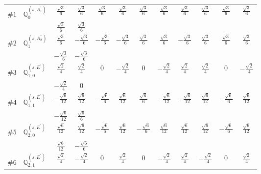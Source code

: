 \documentclass[fleqn,9pt,landscape]{jsarticle}
\begin{document}
\begin{center}
\begin{longtable}{lcccccccccc}
$ \#1\quad \mathbb{Q}_{0}^{(s,A_{1}^{\prime})} $ & $ \frac{\sqrt{3}}{6} $ & $ \frac{\sqrt{3}}{6} $ & $ \frac{\sqrt{3}}{6} $ & $ \frac{\sqrt{3}}{6} $ & $ \frac{\sqrt{3}}{6} $ & $ \frac{\sqrt{3}}{6} $ & $ \frac{\sqrt{3}}{6} $ & $ \frac{\sqrt{3}}{6} $ & $ \frac{\sqrt{3}}{6} $ & $ \frac{\sqrt{3}}{6} $ \\
& $ \frac{\sqrt{3}}{6} $ & $ \frac{\sqrt{3}}{6} $ & $  $ & $  $ & $  $ & $  $ & $  $ & $  $ & $  $ & $  $ \\ \hline
$ \#2\quad \mathbb{Q}_{1}^{(s,A_{2}^{\prime\prime})} $ & $ \frac{\sqrt{3}}{6} $ & $ - \frac{\sqrt{3}}{6} $ & $ - \frac{\sqrt{3}}{6} $ & $ - \frac{\sqrt{3}}{6} $ & $ \frac{\sqrt{3}}{6} $ & $ \frac{\sqrt{3}}{6} $ & $ - \frac{\sqrt{3}}{6} $ & $ \frac{\sqrt{3}}{6} $ & $ \frac{\sqrt{3}}{6} $ & $ \frac{\sqrt{3}}{6} $ \\
& $ - \frac{\sqrt{3}}{6} $ & $ - \frac{\sqrt{3}}{6} $ & $  $ & $  $ & $  $ & $  $ & $  $ & $  $ & $  $ & $  $ \\ \hline
$ \#3\quad \mathbb{Q}_{1,0}^{(s,E^{\prime})} $ & $ \frac{\sqrt{2}}{4} $ & $ \frac{\sqrt{2}}{4} $ & $ 0 $ & $ - \frac{\sqrt{2}}{4} $ & $ 0 $ & $ - \frac{\sqrt{2}}{4} $ & $ \frac{\sqrt{2}}{4} $ & $ \frac{\sqrt{2}}{4} $ & $ 0 $ & $ - \frac{\sqrt{2}}{4} $ \\
& $ - \frac{\sqrt{2}}{4} $ & $ 0 $ & $  $ & $  $ & $  $ & $  $ & $  $ & $  $ & $  $ & $  $ \\ \hline
$ \#4\quad \mathbb{Q}_{1,1}^{(s,E^{\prime})} $ & $ - \frac{\sqrt{6}}{12} $ & $ \frac{\sqrt{6}}{12} $ & $ - \frac{\sqrt{6}}{6} $ & $ \frac{\sqrt{6}}{12} $ & $ \frac{\sqrt{6}}{6} $ & $ - \frac{\sqrt{6}}{12} $ & $ - \frac{\sqrt{6}}{12} $ & $ \frac{\sqrt{6}}{12} $ & $ - \frac{\sqrt{6}}{6} $ & $ \frac{\sqrt{6}}{12} $ \\
& $ - \frac{\sqrt{6}}{12} $ & $ \frac{\sqrt{6}}{6} $ & $  $ & $  $ & $  $ & $  $ & $  $ & $  $ & $  $ & $  $ \\ \hline
$ \#5\quad \mathbb{Q}_{2,0}^{(s,E^{\prime})} $ & $ \frac{\sqrt{6}}{12} $ & $ \frac{\sqrt{6}}{12} $ & $ - \frac{\sqrt{6}}{6} $ & $ \frac{\sqrt{6}}{12} $ & $ - \frac{\sqrt{6}}{6} $ & $ \frac{\sqrt{6}}{12} $ & $ \frac{\sqrt{6}}{12} $ & $ \frac{\sqrt{6}}{12} $ & $ - \frac{\sqrt{6}}{6} $ & $ \frac{\sqrt{6}}{12} $ \\
& $ \frac{\sqrt{6}}{12} $ & $ - \frac{\sqrt{6}}{6} $ & $  $ & $  $ & $  $ & $  $ & $  $ & $  $ & $  $ & $  $ \\ \hline
$ \#6\quad \mathbb{Q}_{2,1}^{(s,E^{\prime})} $ & $ \frac{\sqrt{2}}{4} $ & $ - \frac{\sqrt{2}}{4} $ & $ 0 $ & $ \frac{\sqrt{2}}{4} $ & $ 0 $ & $ - \frac{\sqrt{2}}{4} $ & $ \frac{\sqrt{2}}{4} $ & $ - \frac{\sqrt{2}}{4} $ & $ 0 $ & $ \frac{\sqrt{2}}{4} $ \\

\end{longtable}
\end{center}
\end{document}
